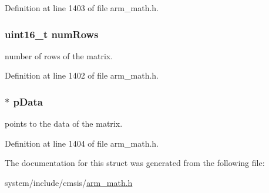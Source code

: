 Definition at line 1403 of file arm\+\_\+math.\+h.

\subsubsection[{\texorpdfstring{num\+Rows}{numRows}}]{\setlength{\rightskip}{0pt plus 5cm}uint16\+\_\+t num\+Rows}\hypertarget{structarm__matrix__instance__q31_a1bcf80ccdc2acc29198f1592ae300390}{}\label{structarm__matrix__instance__q31_a1bcf80ccdc2acc29198f1592ae300390}
number of rows of the matrix. 

Definition at line 1402 of file arm\+\_\+math.\+h.

\subsubsection[{\texorpdfstring{p\+Data}{pData}}]{$\ast$ p\+Data}\hypertarget{structarm__matrix__instance__q31_ad296f76577326ff280726323536eed6d}{}\label{structarm__matrix__instance__q31_ad296f76577326ff280726323536eed6d}
points to the data of the matrix. 

Definition at line 1404 of file arm\+\_\+math.\+h.



The documentation for this struct was generated from the following file\+:\begin{DoxyCompactItemize}
\item 
system/include/cmsis/\hyperlink{arm__math_8h}{arm\+\_\+math.\+h}\end{DoxyCompactItemize}
